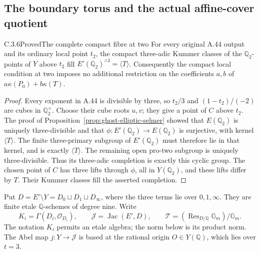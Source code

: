 \subsection{The boundary torus and the actual affine-cover quotient}
\label{sec:ghost-generalized-jacobian}

\begin{result}{C.3.6}{Proved}{The complete compact fibre at two}
\label{lem:ghost-elliptic-two-fibre}
For every original A.44 output and its ordinary local point
\(t_2\), the compact three-adic Kummer classes of the
\(\mathbb Q_2\)-points of \(Y\) above \(t_2\) fill
\(E'(\mathbb Q_2)^{\wedge3}=\langle T\rangle\).
Consequently the compact local condition at two imposes
no additional restriction on the coefficients \(a,b\)
of \(a\kappa(P_0)+b\kappa(T)\).
\end{result}
\begin{proof}
Every exponent in A.44 is divisible by three, so
\(t_2/3\) and \((1-t_2)/(-2)\) are cubes in
\(\mathbb Q_2^\times\). Choose their cube roots
\(u,v\); they give a point of \(C\) above \(t_2\).
The proof of Proposition~\ref{prop:ghost-elliptic-selmer}
showed that \(E(\mathbb Q_2)\) is uniquely
three-divisible and that
\(\phi:E'(\mathbb Q_2)\to E(\mathbb Q_2)\)
is surjective, with kernel \(\langle T\rangle\).
The finite three-primary subgroup of \(E'(\mathbb Q_2)\)
must therefore lie in that kernel, and is exactly
\(\langle T\rangle\). The remaining open pro-two
subgroup is uniquely three-divisible. Thus its
three-adic completion is exactly this cyclic group.
The chosen point of \(C\) has three lifts through
\(\phi\), all in \(Y(\mathbb Q_2)\), and these
lifts differ by \(T\). Their Kummer classes fill
the asserted completion.
\end{proof}

Put \(D=E'\setminus Y=D_0\sqcup D_1\sqcup D_\infty\),
where the three terms lie over \(0,1,\infty\).
They are finite etale \(\mathbb Q\)-schemes of
degree nine. Write
\[
 K_i=\Gamma(D_i,\mathcal O_{D_i}),\qquad
 \mathcal J=\operatorname{Jac}(E',D),\qquad
 \mathcal T=(\operatorname{Res}_{D/\mathbb Q}\mathbb G_m)
                         /\mathbb G_m.
                                                        \tag{25}
\]
The notation \(K_i\) permits an etale algebra; the
norm below is its product norm. The Abel map
\(j:Y\to\mathcal J\) is based at the rational
origin \(O\in Y(\mathbb Q)\), which lies over
\(t=3\).

